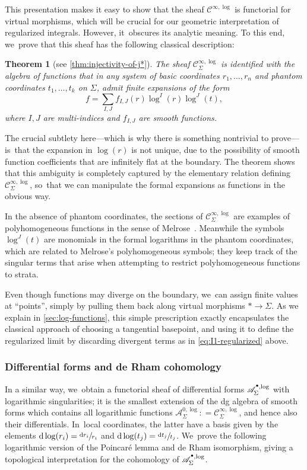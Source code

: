 \documentclass[10pt]{amsart}
\let\oldbullet\bullet
\renewcommand{\bullet}{{\raisebox{1pt}{$\scriptscriptstyle\oldbullet$}}}
\newcommand{\dslog}[1]{\sfrac{\dd#1}{#1}}
\newtheorem{theorem}{Theorem}[section]
\theoremstyle{definition}
\theoremstyle{remark}
\newcommand{\defas}{\mathrel{\mathop:}=}
\newcommand{\Cinflog}[1]{\mathscr{C}^{\infty,\log}_{#1}}
\newcommand{\dd}{\mathrm{d}}
\newcommand{\cAlog}[2][\bullet]{\mathscr{A}^{#1,\log}_{#2}}
\newcommand{\Sig}{\Sigma}
\begin{document}
This presentation makes it easy to show that the sheaf $\Cinflog{}$ is functorial for virtual morphisms, which will be crucial for our geometric interpretation of regularized integrals.
However, it~obscures its analytic meaning. To this end, we~prove that this sheaf has the following classical description:
\begin{theorem}[see \autoref{thm:injectivity-of-j*}]\label{thm:log-functions}
The sheaf $\Cinflog{\Sig}$ is identified with the algebra of functions that in any system of basic coordinates $r_1,\ldots,r_n$ and phantom coordinates $t_1,\ldots,t_k$ on $\Sig$, admit finite expansions of the form
\[
f = \sum_{I,J} f_{I,J}(r)\log^I(r) \log^J(t),
\]
where $I,J$ are multi-indices and $f_{I,J}$ are smooth functions.
\end{theorem}

The crucial subtlety here---which is why there is something nontrivial to prove---is~that the expansion in $\log(r)$ is not unique, due to the possibility of smooth function coefficients that are infinitely flat at the boundary. The theorem shows that this ambiguity is completely captured by the elementary relation defining $\Cinflog{\Sig}$, so~that we can manipulate the formal expansions as functions in the obvious way.

In the absence of phantom coordinates, the sections of $\Cinflog{\Sig}$ are examples of polyhomogeneous functions in the sense of Melrose~\cite{Melrose1992}. Meanwhile the symbols $\log^J(t)$ are monomials in the formal logarithms in the phantom coordinates, which are related to Melrose's polyhomogeneous symbols; they keep track of the singular terms that arise when attempting to restrict polyhomogeneous functions to strata.

Even though functions may diverge on the boundary, we~can assign finite values at ``points'', simply by pulling them back along virtual morphisms $* \to \Sig$. As we explain in \autoref{sec:log-functions}, this simple prescription exactly encapsulates the classical approach of choosing a tangential basepoint, and using it to define the regularized limit by discarding divergent terms as in \eqref{eq:I1-regularized} above.

\subsubsection{Differential forms and de Rham cohomology}
In a similar way, we~obtain a functorial sheaf of differential forms $\cAlog{\Sig}$ with logarithmic singularities; it is the smallest extension of the dg algebra of smooth forms which contains all logarithmic functions $\cAlog[0]{\Sig} \defas \Cinflog{\Sig}$, and hence also their differentials. In~local coordinates, the latter have a basis given by the elements $\dd\log(r_i)=\dslog{r_i}$ and $\dd\log(t_j) = \dslog{t_j}$. We~prove the following logarithmic version of the Poincaré lemma and de Rham isomorphism, giving a topological interpretation for the cohomology of $\cAlog{\Sig}$.
\end{document}
